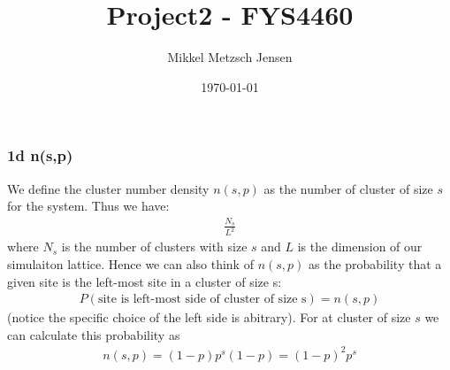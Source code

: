 \documentclass[reprint, amsmath, amssymb, aps]{revtex4-2}
\begin{document}
\title{Project2 - FYS4460}
\author{Mikkel Metzsch Jensen}

\date{\today}
\maketitle
\subsubsection*{1d n(s,p)}
We define the cluster number density $n(s,p)$ as the number of cluster of size $s$ for the system. Thus we have:
\begin{align*}
  \frac{N_s}{L^2}
\end{align*}
where $N_s$ is the number of clusters with size $s$ and $L$ is the dimension of our simulaiton lattice. Hence we can also think of $n(s,p)$ as the probability that a given site is the left-most site in a cluster of size s:
\begin{align*}
  P(\text{site is left-most side of cluster of size s}) = n(s,p)
\end{align*}
(notice the specific choice of the left side is abitrary). For at cluster of size $s$ we can calculate this probability as
\begin{align*}
  n(s,p) = (1-p)p^s(1-p) = (1-p)^2p^s
\end{align*}

\end{document}

